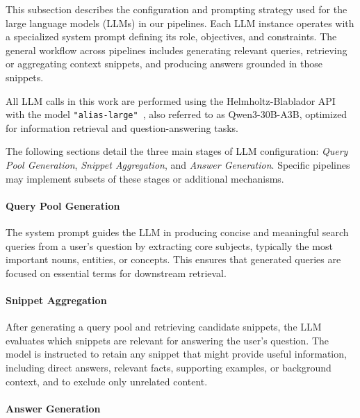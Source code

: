 \documentclass[manuscript,screen]{acmart}
\begin{document}
\begin{CCSXML}
	This subsection describes the configuration and prompting strategy used for the large language models (LLMs) in our pipelines. Each LLM instance operates with a specialized system prompt defining its role, objectives, and constraints. The general workflow across pipelines includes generating relevant queries, retrieving or aggregating context snippets, and producing answers grounded in those snippets.
	
	All LLM calls in this work are performed using the Helmholtz-Blablador API~\cite{blablador_api} with the model \texttt{"alias-large"}~\cite{qwen3_model}, also referred to as Qwen3-30B-A3B, optimized for information retrieval and question-answering tasks.
	
	The following sections detail the three main stages of LLM configuration: \textit{Query Pool Generation}, \textit{Snippet Aggregation}, and \textit{Answer Generation}. Specific pipelines may implement subsets of these stages or additional mechanisms.
	
		\paragraph{Query Pool Generation}
		\label{subsubsec:query-pool-generation}
		
		The system prompt guides the LLM in producing concise and meaningful search queries from a user's question by extracting core subjects, typically the most important nouns, entities, or concepts. This ensures that generated queries are focused on essential terms for downstream retrieval.
		
		\paragraph{Snippet Aggregation}
		\label{subsubsec:snippet-aggregation}
		
		After generating a query pool and retrieving candidate snippets, the LLM evaluates which snippets are relevant for answering the user's question. The model is instructed to retain any snippet that might provide useful information, including direct answers, relevant facts, supporting examples, or background context, and to exclude only unrelated content.
		
		\paragraph{Answer Generation}
		\label{subsubsec:answer-generation}
		

\end{CCSXML}
\end{document}
